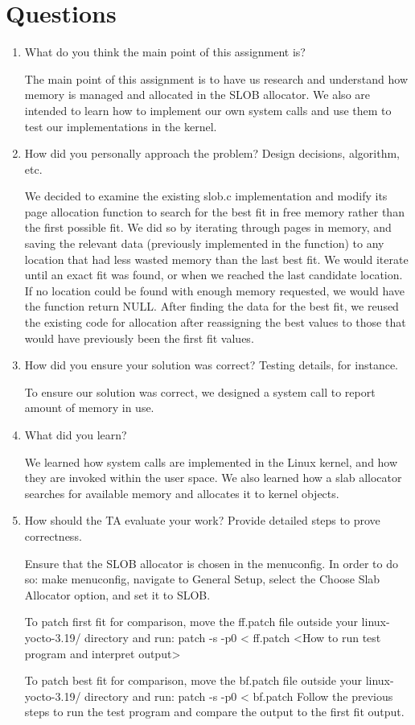 \documentclass[letterpaper,10pt,fleqn]{article}
\begin{document}
\section*{Questions}
\begin{enumerate}
\item What do you think the main point of this assignment is?

The main point of this assignment is to have us research and understand how memory is managed and allocated in the SLOB allocator. We also are intended to learn how to implement our own system calls and use them to test our implementations in the kernel.

\item How did you personally approach the problem? Design decisions, algorithm, etc. 

We decided to examine the existing slob.c implementation and modify its page allocation function to search for the best fit in free memory rather than the first possible fit. We did so by iterating through pages in memory, and saving the relevant data (previously implemented in the function) to any location that had less wasted memory than the last best fit. We would iterate until an exact fit was found, or when we reached the last candidate location. If no location could be found with enough memory requested, we would have the function return NULL. 
After finding the data for the best fit, we reused the existing code for allocation after reassigning the best values to those that would have previously been the first fit values.

\item How did you ensure your solution was correct? Testing details, for instance. 

To ensure our solution was correct, we designed a system call to report amount of memory in use.

\item What did you learn? 

We learned how system calls are implemented in the Linux kernel, and how they are invoked within the user space. We also learned how a slab allocator searches for available memory and allocates it to kernel objects.

\item How should the TA evaluate your work? Provide detailed steps to prove correctness.

Ensure that the SLOB allocator is chosen in the menuconfig. In order to do so:
make menuconfig, navigate to General Setup, select the Choose Slab Allocator option, and set it to SLOB.

To patch first fit for comparison, move the ff.patch file outside your linux-yocto-3.19/ directory and run: patch -s -p0 < ff.patch
<How to run test program and interpret output>

To patch best fit for comparison, move the bf.patch file outside your linux-yocto-3.19/ directory and run: patch -s -p0 < bf.patch
Follow the previous steps to run the test program and compare the output to the first fit output.

\end{enumerate}
\end{document}
